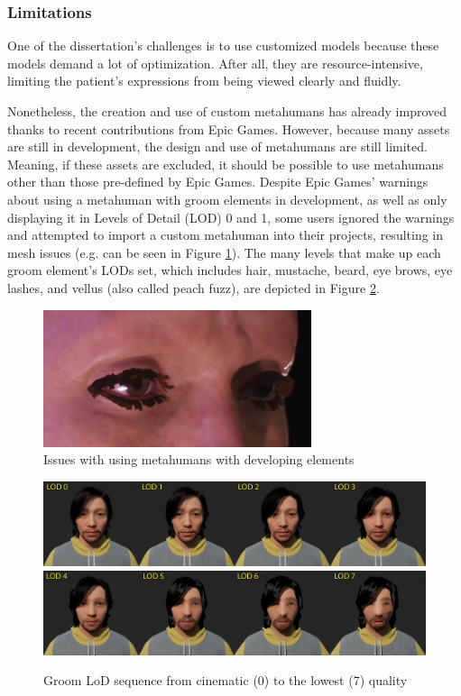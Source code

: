 \subsubsection{Limitations}
One of the dissertation's challenges is to use customized models because these models demand a lot of optimization. After all, they are resource-intensive, limiting the patient's expressions from being viewed clearly and fluidly. 

Nonetheless, the creation and use of custom metahumans has already improved thanks to recent contributions from Epic Games. However, because many assets are still in development, the design and use of metahumans are still limited. Meaning, if these assets are excluded, it should be possible to use metahumans other than those pre-defined by Epic Games. Despite Epic Games' warnings about using a metahuman with groom elements in development, as well as only displaying it in Levels of Detail (LOD) 0 and 1, some users ignored the warnings and attempted to import a custom metahuman into their projects, resulting in mesh issues (e.g. can be seen in Figure \ref{fig:metahumanProblem}). The many levels that make up each groom element's LODs set, which includes hair, mustache, beard, eye brows, eye lashes, and vellus (also called peach fuzz), are depicted in Figure \ref{fig:LOD}.

\begin{figure}[!htb]
\includegraphics[width=0.7\textwidth]{figures/eyelashes.PNG}
\centering
\caption{Issues with using metahumans with developing elements}
\label{fig:metahumanProblem}
\end{figure}

\begin{figure}[!htb]
\includegraphics[width=\textwidth]{figures/GroomLODSequence1.PNG}
\includegraphics[width=\textwidth]{figures/GroomLODSequence2.PNG}
\centering
\caption{Groom LoD sequence from cinematic (0) to the lowest (7) quality}
\label{fig:LOD}
\end{figure}

